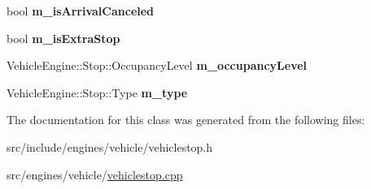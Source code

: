 \begin{DoxyCompactItemize}
bool {\bfseries m\+\_\+is\+Arrival\+Canceled}
\item 
\mbox{\label{classVehicleEngine_1_1Stop_aba84b74fdf970bff43427887a7153d04}} 
bool {\bfseries m\+\_\+is\+Extra\+Stop}
\item 
\mbox{\label{classVehicleEngine_1_1Stop_a011edd566f330f6b7786a4839e2626c3}} 
Vehicle\+Engine\+::\+Stop\+::\+Occupancy\+Level {\bfseries m\+\_\+occupancy\+Level}
\item 
\mbox{\label{classVehicleEngine_1_1Stop_ae65e93f8605a1a5b25383241da4749fe}} 
Vehicle\+Engine\+::\+Stop\+::\+Type {\bfseries m\+\_\+type}
\end{DoxyCompactItemize}


The documentation for this class was generated from the following files\+:\begin{DoxyCompactItemize}
\item 
src/include/engines/vehicle/vehiclestop.\+h\item 
src/engines/vehicle/\mbox{\hyperlink{vehiclestop_8cpp}{vehiclestop.\+cpp}}\end{DoxyCompactItemize}

